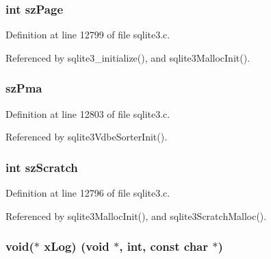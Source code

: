\subsubsection[{sz\+Page}]{\setlength{\rightskip}{0pt plus 5cm}int sz\+Page}\label{struct_sqlite3_config_a0ead96b04a1cc6dc6ec781782e82d052}


Definition at line 12799 of file sqlite3.\+c.



Referenced by sqlite3\+\_\+initialize(), and sqlite3\+Malloc\+Init().

\hypertarget{struct_sqlite3_config_a0f0553f38ecaca298abe54686a1c4bcb}{}
\subsubsection[{sz\+Pma}]{ sz\+Pma}\label{struct_sqlite3_config_a0f0553f38ecaca298abe54686a1c4bcb}


Definition at line 12803 of file sqlite3.\+c.



Referenced by sqlite3\+Vdbe\+Sorter\+Init().

\hypertarget{struct_sqlite3_config_a27161f3af9d9fa4dc7c97ce5fbc5704e}{}
\subsubsection[{sz\+Scratch}]{\setlength{\rightskip}{0pt plus 5cm}int sz\+Scratch}\label{struct_sqlite3_config_a27161f3af9d9fa4dc7c97ce5fbc5704e}


Definition at line 12796 of file sqlite3.\+c.



Referenced by sqlite3\+Malloc\+Init(), and sqlite3\+Scratch\+Malloc().

\hypertarget{struct_sqlite3_config_a7a8507f3e16dc355181b5f226ec31d19}{}
\subsubsection[{x\+Log}]{\setlength{\rightskip}{0pt plus 5cm}void($\ast$ x\+Log) (void $\ast$, int, const char $\ast$)}\label{struct_sqlite3_config_a7a8507f3e16dc355181b5f226ec31d19}


